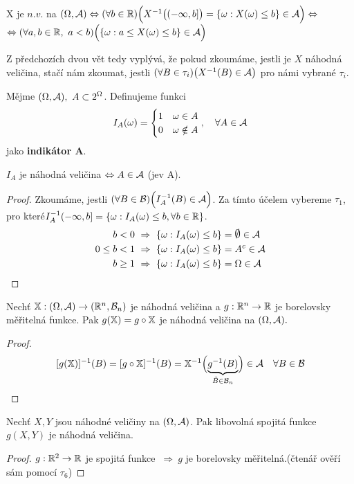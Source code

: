 \begin{dusl}
	X je $n.v.$ na $(\Omega,\mathcal{A}) \Leftrightarrow (\forall b \in \mathbb{R})\Bigl(X^{-1}\bigl((-\infty,b]\bigr)=\{ \omega: X(\omega)\leq b \}\in\mathcal{A}\Bigr)\Leftrightarrow$
	$\Leftrightarrow (\forall a,b \in \mathbb{R},~a<b) \Bigl(\{ \omega: a\leq X(\omega)\leq b \}\in\mathcal{A}\Bigr)$
\end{dusl}
\begin{remark}
	Z předchozích dvou vět tedy vyplývá, že pokud zkoumáme, jestli je $X$ náhodná veličina, stačí nám zkoumat, jestli $(\forall B\in\tau_i)\bigl(X^{-1}(B)\in\mathcal{A}\bigr)$ pro námi vybrané $\tau_i$.
\end{remark}
\begin{define}
	Mějme $(\Omega,\mathcal{A}),~A \subset 2^\Omega$. Definujeme funkci 
	\[
	I_A(\omega)=
	\begin{cases}
		1 & \omega \in A\\
		0 & \omega \notin A
	\end{cases},~~~\forall A\in\mathcal{A}
	\]
	jako \textbf{indikátor A}.
\end{define}
\begin{theorem}
	$I_A$ je náhodná veličina $\Leftrightarrow A \in \mathcal{A}$ (jev A).
	\begin{proof}
		Zkoumáme, jestli $(\forall B \in \mathcal{B}) \Bigl(I_A^{-1}(B)\in \mathcal{A}\Bigr)$. Za tímto účelem vybereme $\tau_1$, pro které\newline $I_A^{-1}(-\infty,b]=\{ \omega: I_A(\omega) \leq b,\forall b \in \mathbb{R} \} $.
		\[
		\begin{split}
		 b<0 &~\Rightarrow~ \{ \omega: I_A(\omega)\leq b \} = \emptyset\in\Aa \\
		 0\leq b<1 &~\Rightarrow~ \{ \omega: I_A(\omega)\leq b \}=A^c\in\Aa\\
		 b\geq 1 &~\Rightarrow~ \{ \omega: I_A(\omega)\leq b \} = \Omega\in\Aa
		\end{split}
		\]
	\end{proof}
\end{theorem}
\begin{theorem}
	Nechť $\mathbb{X}:(\Omega,\mathcal{A})\to (\mathbb{R}^n,\mathcal{B}_n)$ je náhodná veličina a $g:\mathbb{R}^n\to\mathbb{R}$ je borelovsky měřitelná funkce. Pak $g(\mathbb{X})=g\circ \mathbb{X}$ je náhodná veličina na $(\Omega,\mathcal{A}).$
	\begin{proof} 
		\[
		[g(\mathbb{X})]^{-1}(B)=[g\circ \mathbb{X}]^{-1}(B)=\mathbb{X}^{-1}\Bigl(\underbrace{g^{-1}(B)}_{\tilde{B}\in\mathcal{B}_n}\Bigr)\in\mathcal{A}~~~\forall B \in \mathcal{B}
		\]
	\end{proof}
\end{theorem}
\begin{dusl}
	Nechť $X,Y$ jsou náhodné veličiny na $(\Omega,\mathcal{A})$. Pak libovolná spojitá funkce $g(X,Y)$ je náhodná veličina. 
	\begin{proof}
		$g:\mathbb{R}^2\to\mathbb{R}$ je spojitá funkce $~\Rightarrow~ g $ je borelovsky měřitelná.\newline (čtenář ověří sám pomocí $\tau_6$)
	\end{proof}
\end{dusl}
